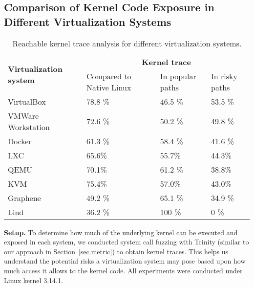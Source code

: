 {{\subsection{Comparison of Kernel Code Exposure in Different Virtualization
Systems}
\label{Reachable-Kernel-Trace-Analysis-for-Different-Virtualization-Systems}
\begin{table}
\centering
\scriptsize
\begin{tabular}{|l|l|l|l|}
  \hline
  \multirow{3}{1.5cm}{\bf Virtualization system} & \multicolumn{3}{c|}{\bf Kernel trace} \\ \cline{2-4}
  & \multirow{2}{1.5cm}{Compared to Native Linux} & \multirow{2}{1.5cm}{In popular paths} & \multirow{2}{1cm}{In risky paths} \\
  & & & \\  \hline
  VirtualBox & 78.8 \% & 46.5 \% & 53.5 \% \\
  \hline
  \multirow{2}{1.5cm}{VMWare Workstation} & \multirow{2}{*}{72.6 \%} &
  \multirow{2}{*}{50.2 \%} & \multirow{2}{*}{49.8 \%} \\
  & & & \\   \hline
  Docker & 61.3 \% & 58.4 \% & 41.6 \% \\
  \hline
  LXC &  65.6\% &  55.7\% &  44.3\% \\
  \hline
   QEMU &  70.1\% & 61.2 \% &  38.8\% \\
  \hline
   KVM &  75.4\% &  57.0\% &  43.0\% \\
  \hline
  Graphene & 49.2 \% & 65.1 \% & 34.9 \% \\
  \hline
  Lind & 36.2 \% & 100 \% & 0 \% \\
  \hline
\end{tabular}
\caption{\small Reachable kernel trace analysis for different virtualization
systems.}
\label{table:trace-systems}
\end{table}


\noindent
\textbf{Setup.}
To determine how much of the underlying kernel can be executed and exposed in
each system,
we conducted system call fuzzing with Trinity (similar to our approach in
Section~{\ref{sec.metric}}) to obtain
kernel traces. This helps us understand the potential risks a virtualization system
may pose based upon how much access it allows to the kernel code.
All experiments were conducted under Linux kernel 3.14.1.

}}
